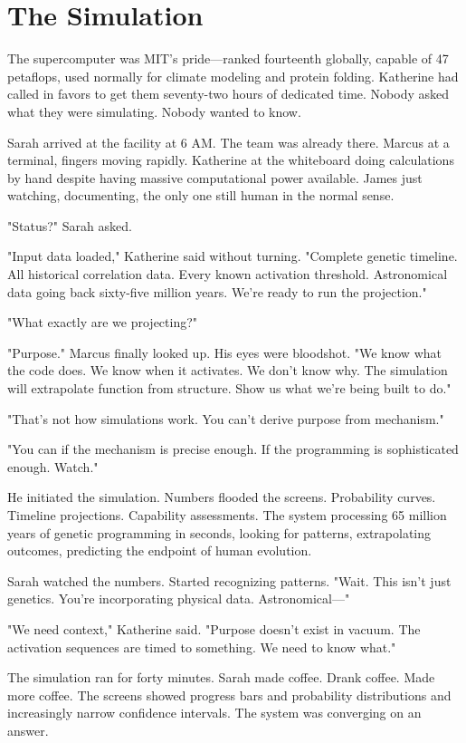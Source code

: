 \chapter{The Simulation}
\label{ch:21}


The supercomputer was MIT's pride—ranked fourteenth globally, capable of 47 petaflops, used normally for climate modeling and protein folding. Katherine had called in favors to get them seventy-two hours of dedicated time. Nobody asked what they were simulating. Nobody wanted to know.

Sarah arrived at the facility at 6 AM. The team was already there. Marcus at a terminal, fingers moving rapidly. Katherine at the whiteboard doing calculations by hand despite having massive computational power available. James just watching, documenting, the only one still human in the normal sense.

"Status?" Sarah asked.

"Input data loaded," Katherine said without turning. "Complete genetic timeline. All historical correlation data. Every known activation threshold. Astronomical data going back sixty-five million years. We're ready to run the projection."

"What exactly are we projecting?"

"Purpose." Marcus finally looked up. His eyes were bloodshot. "We know what the code does. We know when it activates. We don't know why. The simulation will extrapolate function from structure. Show us what we're being built to do."

"That's not how simulations work. You can't derive purpose from mechanism."

"You can if the mechanism is precise enough. If the programming is sophisticated enough. Watch."

He initiated the simulation. Numbers flooded the screens. Probability curves. Timeline projections. Capability assessments. The system processing 65 million years of genetic programming in seconds, looking for patterns, extrapolating outcomes, predicting the endpoint of human evolution.

Sarah watched the numbers. Started recognizing patterns. "Wait. This isn't just genetics. You're incorporating physical data. Astronomical—"

"We need context," Katherine said. "Purpose doesn't exist in vacuum. The activation sequences are timed to something. We need to know what."

The simulation ran for forty minutes. Sarah made coffee. Drank coffee. Made more coffee. The screens showed progress bars and probability distributions and increasingly narrow confidence intervals. The system was converging on an answer.

